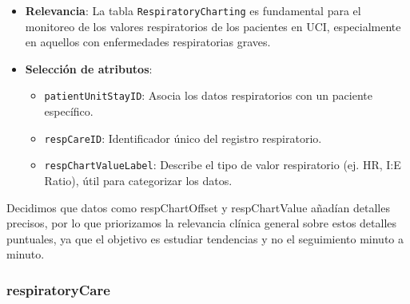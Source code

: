 \documentclass[12pt, a4paper, twoside]{article}
\begin{document}
	\begin{itemize}
		\item \textbf{Relevancia}: La tabla \texttt{RespiratoryCharting} es fundamental para el monitoreo de los valores respiratorios de los pacientes en UCI, especialmente en aquellos con enfermedades respiratorias graves.
		
		\item \textbf{Selección de atributos}:
		\begin{itemize}
			\item \texttt{patientUnitStayID}: Asocia los datos respiratorios con un paciente específico.
			\item \texttt{respCareID}: Identificador único del registro respiratorio.
			\item \texttt{respChartValueLabel}: Describe el tipo de valor respiratorio (ej. HR, I:E Ratio), útil para categorizar los datos.
		\end{itemize}
		
	\end{itemize}
	
	Decidimos que datos como respChartOffset y respChartValue añadían detalles precisos, por lo que priorizamos la relevancia clínica general sobre estos detalles puntuales, ya que el objetivo es estudiar tendencias y no el seguimiento minuto a minuto.  \cite{eICU2024}
	
	\subsubsection{respiratoryCare}
	
\end{document}
